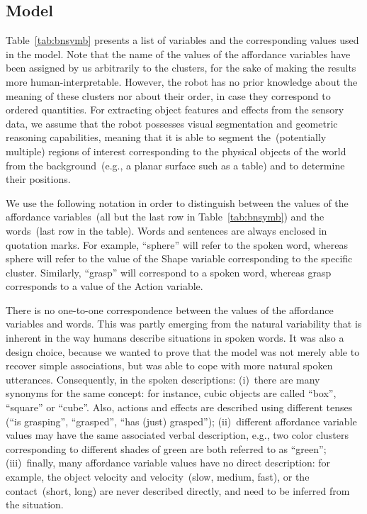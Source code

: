 \subsection{\AffWords{} Model}
Table~\ref{tab:bnsymb} presents a list of variables and the corresponding values used in the \AffWords{} model.
Note that the name of the values of the affordance variables have been assigned by us arbitrarily to the clusters, for the sake of making the results more human-interpretable.
However, the robot has no prior knowledge about the meaning of these clusters nor about their order, in case they correspond to ordered quantities.
For extracting object features and effects from the sensory data, we assume that the robot possesses visual segmentation and geometric reasoning capabilities, meaning that it is able to segment the~(potentially multiple) regions of interest corresponding to the physical objects of the world from the background~(e.g., a planar surface such as a table) and to determine their positions.

We use the following notation in order to distinguish between the values of the affordance variables~(all but the last row in Table~\ref{tab:bnsymb}) and the words~(last row in the table).
Words and sentences are always enclosed in quotation marks.
For example, ``sphere'' will refer to the spoken word, whereas sphere will refer to the value of the Shape variable corresponding to the specific cluster.
Similarly, ``grasp'' will correspond to a spoken word, whereas grasp corresponds to a value of the Action variable.

There is no one-to-one correspondence between the values of the affordance variables and words.
This was partly emerging from the natural variability that is inherent in the way humans describe situations in spoken words.
It was also a design choice, because we wanted to prove that the model was not merely able to recover simple \wordmeaning{} associations, but was able to cope with more natural spoken utterances.
Consequently, in the spoken descriptions:
(i)~there are many synonyms for the same concept: for instance, cubic objects are called ``box'', ``square'' or ``cube''. Also, actions and effects are described using different tenses (``is grasping'', ``grasped'', ``has (just) grasped'');
(ii)~different affordance variable values may have the same associated verbal description, e.g., two color clusters corresponding to different shades of green are both referred to as ``green'';
(iii)~finally, many affordance variable values have no direct description: for example, the object velocity and \objecthand{} velocity~(slow, medium, fast), or the \objecthand{} contact~(short, long) are never described directly, and need to be inferred from the situation.

